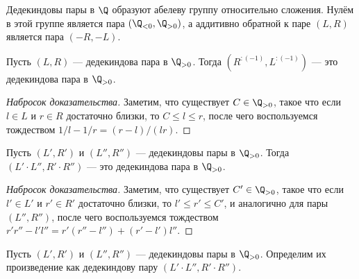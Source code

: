 \documentclass[
	extrafontsizes,
	11pt,
	hyphens,
]{memoir}
\begin{document}
\begin{observation}
Дедекиндовы пары в \(\Q\) образуют абелеву группу относительно сложения.
\label{obs:DedPairAddGr}
Нулём в этой группе является пара
\((\Q_{<0}, \Q_{>0})\),
а аддитивно обратной к паре \((L,R)\) является пара \((-R,-L)\).
\end{observation}

\begin{lemma}
Пусть \((L,R)\) --- дедекиндова пара в \(\Q_{>0}\).
\label{lem:DedPairInv}
Тогда \((R^{:(-1)}, L^{:(-1)})\)
--- это дедекиндова пара в \(\Q_{>0}\).
\end{lemma}

\begin{proof}[Набросок доказательства]
Заметим, что существует \(C \in \Q_{>0}\), такое что если \(l \in L\) и \(r \in R\) достаточно близки, то \(C \leq l \leq r\),
после чего воспользуемся тождеством
\(1/l - 1/r = (r-l)/(lr)\).
\end{proof}

\begin{lemma}
\label{lem:DedPairProd}
Пусть \((L',R')\) и \((L'',R'')\) --- дедекиндовы пары в \(\Q_{>0}\).
Тогда \((L' \cdot L'', R' \cdot R'')\)
--- это дедекиндова пара в \(\Q_{>0}\).
\end{lemma}

\begin{proof}[Набросок доказательства]
Заметим, что существует \(C' \in \Q_{>0}\), такое что если \(l' \in L'\) и \(r' \in R'\) достаточно близки, то \(l' \leq r' \leq C'\), и аналогично для пары \((L'',R'')\),
после чего воспользуемся тождеством
\(
r' r'' - l' l'' =
r' (r'' - l'') +
(r' - l') l''
\).
\end{proof}

\begin{definition}
Пусть \((L',R')\) и \((L'',R'')\) --- дедекиндовы пары в \(\Q_{>0}\).
Определим их произведение как дедекиндову пару
\((L' \cdot L'', R' \cdot R'')\).
\end{definition}
\end{document}
